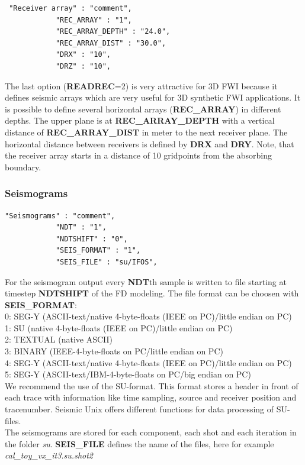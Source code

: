 \begin{verbatim}
 "Receiver array" : "comment",
			"REC_ARRAY" : "1",
			"REC_ARRAY_DEPTH" : "24.0",
			"REC_ARRAY_DIST" : "30.0",
			"DRX" : "10",
			"DRZ" : "10",
\end{verbatim}

The last option (\textbf{READREC}=2) is very attractive for 3D FWI because it defines seismic arrays which are very useful for 3D synthetic FWI applications. It is possible to define several horizontal arrays (\textbf{REC\_ARRAY}) in different depths. The upper plane is at \textbf{REC\_ARRAY\_DEPTH} with a vertical distance of \textbf{REC\_ARRAY\_DIST} in meter to the next receiver plane. The horizontal distance between receivers is defined by \textbf{DRX} and \textbf{DRY}. Note, that the receiver array starts in a distance of 10 gridpoints from the absorbing boundary.
\subsubsection*{Seismograms}
\begin{verbatim}
"Seismograms" : "comment",
			"NDT" : "1",
			"NDTSHIFT" : "0",
			"SEIS_FORMAT" : "1",
			"SEIS_FILE" : "su/IFOS",
\end{verbatim}

For the seismogram output every \textbf{NDT}th sample is written to file starting at timestep \textbf{NDTSHIFT} of the FD modeling. The file format can be choosen with \textbf{SEIS\_FORMAT}:\\
0: SEG-Y (ASCII-text/native 4-byte-floats (IEEE on PC)/little endian on PC)\\
1: SU (native 4-byte-floats (IEEE on PC)/little endian on PC)\\
2: TEXTUAL (native ASCII)\\
3: BINARY (IEEE-4-byte-floats on PC/little endian on PC)\\
4: SEG-Y (ASCII-text/native 4-byte-floats (IEEE on PC)/little endian on PC)\\
5: SEG-Y (ASCII-text/IBM-4-byte-floats on PC/big endian on PC) \\
We recommend the use of the SU-format. This format stores a header in front of each trace with information like time sampling, source and receiver position and tracenumber. Seismic Unix offers different functions for data processing of SU-files.\\
The seismograms are stored for each component, each shot and each iteration in the folder \textit{su}. \textbf{SEIS\_FILE} defines the name of the files, here for example \textit{cal\_toy\_vx\_it3.su.shot2}
